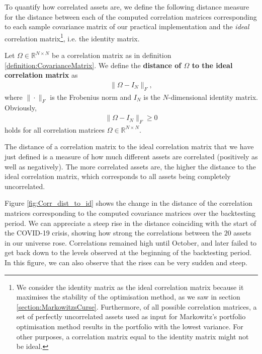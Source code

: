         To quantify how correlated assets are, we define the following distance measure for the distance between each of the computed correlation matrices corresponding to each sample covariance matrix of our practical implementation and the \textit{ideal} correlation matrix\footnote{We consider the identity matrix as the ideal correlation matrix because it maximises the stability of the optimisation method, as we saw in section \ref{section:MarkowitzsCurse}. Furthermore, of all possible correlation matrices, a set of perfectly uncorrelated assets used as input for Markowitz's portfolio optimisation method results in the portfolio with the lowest variance. For other purposes, a correlation matrix equal to the identity matrix might not be ideal.}, i.e. the identity matrix.
        
        \begin{definition}\label{definition:DistanceToIdealCorrMatrix}
		    Let $\Omega \in \mathbb{R}^{N \times N}$ be a correlation matrix as in definition \ref{definition:CovarianceMatrix}. We define the \textbf{distance of $\Omega$ to the ideal correlation matrix} as
		    \begin{align*}
		        \| \Omega - I_N \|_F,
		    \end{align*}
		    where $\| \cdot \|_F$ is the Frobenius norm and $I_N$ is the $N$-dimensional identity matrix. Obviously,
		    \begin{align*}
		        \| \Omega - I_N \|_F \geq 0
		    \end{align*}
		    holds for all correlation matrices $\Omega \in \mathbb{R}^{N \times N}$.
		\end{definition}
		
		The distance of a correlation matrix to the ideal correlation matrix that we have just defined is a measure of how much different assets are correlated (positively as well as negatively). The more correlated assets are, the higher the distance to the ideal correlation matrix, which corresponds to all assets being completely uncorrelated.
		
		Figure \ref{fig:Corr_dist_to_id} shows the change in the distance of the correlation matrices corresponding to the computed covariance matrices over the backtesting period. We can appreciate a steep rise in the distance coinciding with the start of the COVID-19 crisis, showing how strong the correlations between the $20$ assets in our universe rose. Correlations remained high until October, and later failed to get back down to the levels observed at the beginning of the backtesting period. In this figure, we can also observe that the rises can be very sudden and steep.
		
